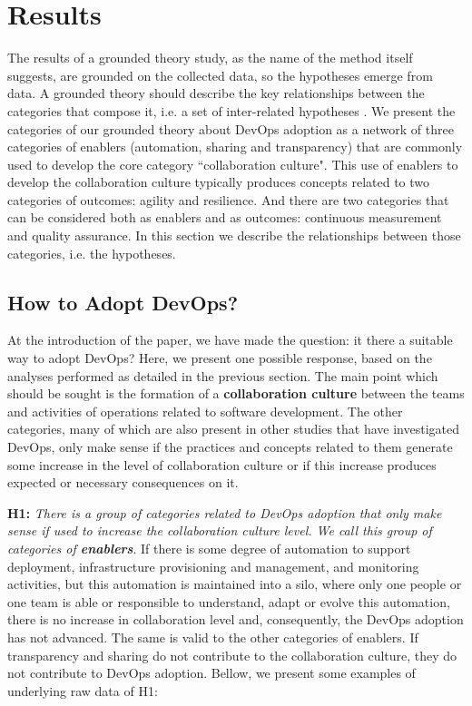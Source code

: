 \section{Results} \label{sec:results}
The results of a grounded theory study, as the name of the method itself
suggests, are grounded on the collected data, so the hypotheses emerge from
data. A grounded theory should describe the key relationships between the
categories that compose it, i.e. a set of inter-related hypotheses
\cite{hoda2017becoming}. We present the categories of our grounded theory
about DevOps adoption as a network of three categories of enablers (automation,
sharing and transparency) that are commonly used to develop the core category
``collaboration culture". This use of enablers to develop the collaboration
culture typically produces concepts related to two categories of outcomes:
agility and resilience. And there are two categories that can be considered
both as enablers and as outcomes: continuous measurement and quality assurance.
In this section we describe the relationships between those categories, i.e.
the hypotheses.

\subsection{How to Adopt DevOps?}
At the introduction of the paper, we have made the question: it there a
suitable way to adopt DevOps? Here, we present one possible response, based
on the analyses performed as detailed in the previous section. The main point
which should be sought is the formation of a \textbf{collaboration culture}
between the teams and activities of operations related to software development.
The other categories, many of which are also present in other studies that have
investigated DevOps, only make sense if the practices and concepts related to
them generate some increase in the level of collaboration culture or if this
increase produces expected or necessary consequences on it.

\textbf{H1:} \textit{There is a group of categories related to DevOps adoption
that only make sense if used to increase the collaboration culture level. We
call this group of categories of \textbf{enablers}}. If there is some degree of
automation to support deployment, infrastructure provisioning and management,
and monitoring activities, but this automation is maintained into a silo, where
only one people or one team is able or responsible to understand, adapt or
evolve this automation, there is no increase in collaboration level and,
consequently, the DevOps adoption has not advanced. The same is valid to the
other categories of enablers. If transparency and sharing do not contribute to
the collaboration culture, they do not contribute to DevOps adoption. Bellow,
we present some examples of underlying raw data of H1:

